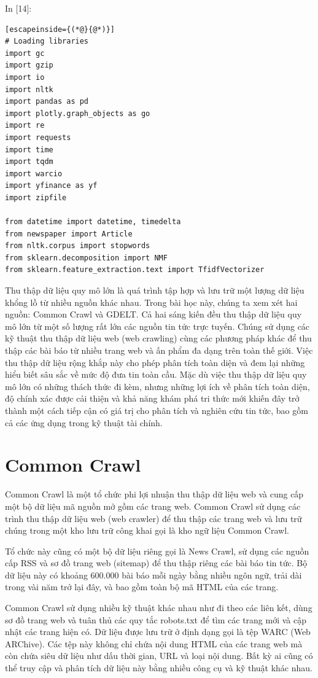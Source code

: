 In {[}14{]}:

\begin{lstlisting}[escapeinside={(*@}{@*)}]
# Loading libraries
import gc
import gzip
import io
import nltk
import pandas as pd
import plotly.graph_objects as go
import re
import requests
import time
import tqdm
import warcio
import yfinance as yf
import zipfile

from datetime import datetime, timedelta
from newspaper import Article
from nltk.corpus import stopwords
from sklearn.decomposition import NMF
from sklearn.feature_extraction.text import TfidfVectorizer
\end{lstlisting}

Thu thập dữ liệu quy mô lớn là quá trình tập hợp và lưu trữ một lượng dữ liệu khổng lồ từ nhiều nguồn khác nhau. Trong bài học này, chúng ta xem xét hai nguồn: Common Crawl và GDELT. Cả hai sáng kiến đều thu thập dữ liệu quy mô lớn từ một số lượng rất lớn các nguồn tin tức trực tuyến. Chúng sử dụng các kỹ thuật thu thập dữ liệu web (web crawling) cùng các phương pháp khác để thu thập các bài báo từ nhiều trang web và ấn phẩm đa dạng trên toàn thế giới. Việc thu thập dữ liệu rộng khắp này cho phép phân tích toàn diện và đem lại những hiểu biết sâu sắc về mức độ đưa tin toàn cầu. Mặc dù việc thu thập dữ liệu quy mô lớn có những thách thức đi kèm, nhưng những lợi ích về phân tích toàn diện, độ chính xác được cải thiện và khả năng khám phá tri thức mới khiến đây trở thành một cách tiếp cận có giá trị cho phân tích và nghiên cứu tin tức, bao gồm cả các ứng dụng trong kỹ thuật tài chính.

\section{Common Crawl}

Common Crawl là một tổ chức phi lợi nhuận thu thập dữ liệu web và cung cấp một bộ dữ liệu mã nguồn mở gồm các trang web. Common Crawl sử dụng các trình thu thập dữ liệu web (web crawler) để thu thập các trang web và lưu trữ chúng trong một kho lưu trữ công khai gọi là kho ngữ liệu Common Crawl.

Tổ chức này cũng có một bộ dữ liệu riêng gọi là News Crawl, sử dụng các nguồn cấp RSS và sơ đồ trang web (sitemap) để thu thập riêng các bài báo tin tức. Bộ dữ liệu này có khoảng 600.000 bài báo mỗi ngày bằng nhiều ngôn ngữ, trải dài trong vài năm trở lại đây, và bao gồm toàn bộ mã HTML của các trang.

Common Crawl sử dụng nhiều kỹ thuật khác nhau như đi theo các liên kết, dùng sơ đồ trang web và tuân thủ các quy tắc robots.txt để tìm các trang mới và cập nhật các trang hiện có. Dữ liệu được lưu trữ ở định dạng gọi là tệp WARC (Web ARChive). Các tệp này không chỉ chứa nội dung HTML của các trang web mà còn chứa siêu dữ liệu như dấu thời gian, URL và loại nội dung. Bất kỳ ai cũng có thể truy cập và phân tích dữ liệu này bằng nhiều công cụ và kỹ thuật khác nhau.

